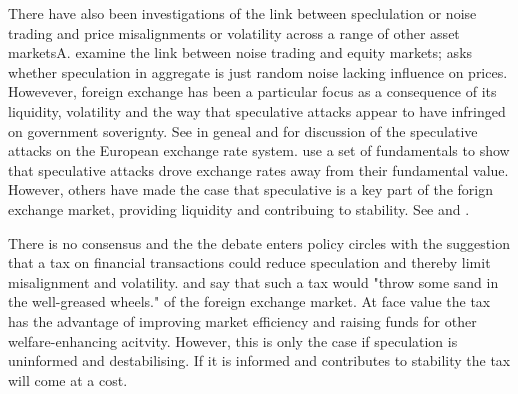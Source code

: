 \documentclass[ijfs,article,submit,oneauthor,pdftex,10pt,a4paper]{mdpi}
\begin{document}
There have also been investigations of the link between speclulation or noise trading and price misalignments or volatility across a range of other asset marketsA.  \citet{Verma} examine the link between noise trading and equity markets; \citet{Hongjun} asks whether speculation in aggregate is just random noise lacking influence on prices.  Howevever, foreign exchange has been a particular focus as a consequence of its liquidity, volatility and the way that speculative attacks appear to have infringed on government soverignty.  See \citet{Dornbusch1988} in geneal and \citet{Eichengreen1988} for discussion of the speculative attacks on the European exchange rate system.  \citet{Eichengreen1994} use a set of fundamentals to show that speculative attacks drove exchange rates away from their fundamental value. However, others have made the case that speculative is a key part of the forign exchange market, providing liquidity and contribuing to stability.  See \citet{Mayer1985} and \citet{McKinnon1986}.   

There is no consensus and the the debate enters policy circles with the suggestion that a tax on financial transactions could reduce speculation and thereby limit misalignment and volatility. \citet[pp.158]{TobinTax} and \citet{Tobin1988a} say that such a tax would "throw some sand in the well-greased wheels." of the foreign exchange market. At face value the tax has the advantage of improving market efficiency and raising funds for other welfare-enhancing acitvity.  However, this is only the case if speculation is uninformed and destabilising.  If it is informed and contributes to stability the tax will come at a cost. 
\end{document}
